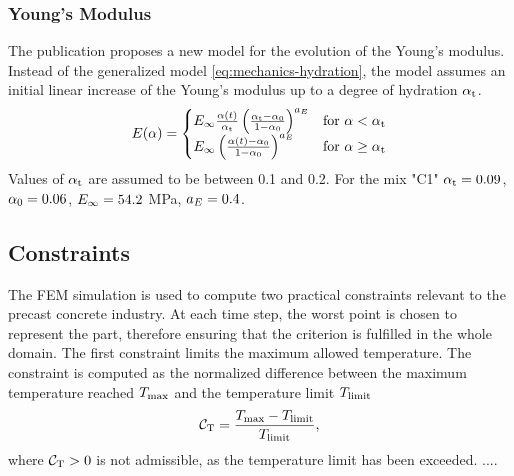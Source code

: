 \subsubsection{Young's Modulus}
The publication proposes a new model for the evolution of the Young's modulus.
Instead of the generalized model \eqref{eq:mechanics-hydration}, the model assumes an initial linear increase of the Young's modulus up to a degree of hydration $\alpha_{\text{t}}$.
\begin{align}
	E(\alpha) = 
	\begin{cases}
		E_\infty  \frac{\alpha(t)}{\alpha_{\text{t}}}\left( \frac{\alpha_{\text{t}}-\alpha_{0}}{1-\alpha_{0}}\right)^{a_{E}}   
		& \text{for $\alpha < \alpha_{\text{t}}$}\\
		E_\infty  \left( \frac{\alpha(t)-\alpha_{0}}{1-\alpha_{0}}\right)^{a_{E}}  
		& \text{for $\alpha \ge \alpha_{\text{t}}$}
	\end{cases}\label{eq:EwrtDOH}
\end{align}
Values of $\alpha_{\text{t}}$ are assumed to be between 0.1 and 0.2.
For the mix "C1" $\alpha_{\text{t}} = 0.09$, $\alpha_{0} = 0.06$, $E_\infty = 54.2$ MPa, $a_{E} = 0.4$.

\subsection{Constraints}
The FEM simulation is used to compute two practical constraints relevant to the precast concrete industry.
At each time step, the worst point is chosen to represent the part, therefore ensuring that the criterion is fulfilled in the whole domain.
The first constraint limits the maximum allowed temperature.
The constraint is computed as the normalized difference between the maximum temperature reached $T_{\text{max}}$ and the temperature limit $T_{\text{limit}}$ 
\begin{align}
	\mathcal{C}_{\text{T}} = \frac{T_{\text{max}} - T_{\text{limit}}}{T_{\text{limit}}}, \label{eq:concstraintT}
\end{align}
where $\mathcal{C}_{\text{T}} > 0$ is not admissible, as the temperature limit has been exceeded.
....


